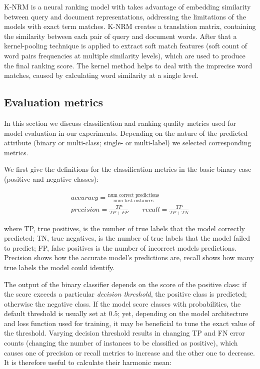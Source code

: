 K-NRM \cite{xiong2017end} is a neural ranking model with takes advantage of embedding similarity between query and document representations, addressing the limitations of the models with exact term matches. K-NRM creates a translation matrix, containing the similarity between each pair of query and document words. After that a kernel-pooling technique is applied to extract soft match features (soft count of word pairs frequencies at multiple similarity levels), which are used to produce the final ranking score. The kernel method helps to deal with the imprecise word matches, caused by calculating word similarity at a single level.

\subsection{Evaluation metrics}

In this section we discuss classification and ranking quality metrics used for model evaluation in our experiments. Depending on the nature of the predicted attribute (binary or multi-class; single- or multi-label) we selected corresponding metrics. 

 We first give the definitions for the classification metrics in the basic binary case (positive and negative classes):

\begin{gather}
    accuracy = \frac{\text{num correct predictions}}{\text{num test instances}} \\
    precision = \frac{TP}{TP + FP} \quad \quad recall = \frac{TP}{TP + TN}
\end{gather}


where TP, true positives, is the number of true labels that the model correctly predicted; TN, true negatives, is the number of true labels that the model failed to predict; FP, false positives is the number of incorrect models predictions. Precision shows how the accurate model's predictions are, recall shows how many true labels the model could identify. 

The output of the binary classifier depends on the score of the positive class: if the score exceeds a particular \textit{decision threshold}, the positive class is predicted; otherwise the negative class. If the model score classes with probabilities, the default threshold is usually set at $0.5$; yet, depending on the model architecture and loss function used for training, it may be beneficial to tune the exact value of the threshold. Varying decision threshold results in changing TP and FN error counts (changing the number of instances to be classified as positive), which causes one of precision or recall metrics to increase and the other one to decrease. It is therefore useful to calculate their harmonic mean:

